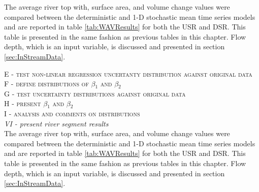 \begin{linenumbers}
The average river top with, surface area, and volume change values were compared between the deterministic and 1-D stochastic mean time series models and are reported in table \ref{tab:WAVResults} for both the USR and DSR.  This table is presented in the same fashion as previous tables in this chapter.  Flow depth, which is an input variable, is discussed and presented in section \ref{sec:InStreamData}.

\textsc{E - test non-linear regression uncertanty distribution against original data}\\

\textsc{F - define distributions of $\beta_1$ and $\beta_2$}\\

\textsc{G - test uncertainty distributions against original data}\\

\textsc{H - present $\beta_1$ and $\beta_2$}\\

\textsc{I - analysis and comments on distributions}\\

\emph{VI - present river segment results}\\
The average river top with, surface area, and volume change values were compared between the deterministic and 1-D stochastic mean time series models and are reported in table \ref{tab:WAVResults} for both the USR and DSR.  This table is presented in the same fashion as previous tables in this chapter.  Flow depth, which is an input variable, is discussed and presented in section \ref{sec:InStreamData}.


\end{linenumbers}
